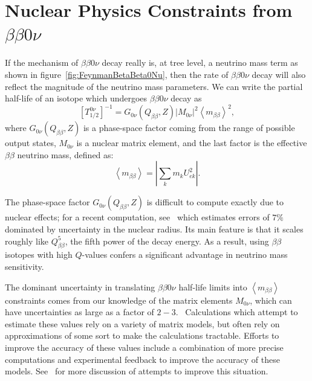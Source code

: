 \section{Nuclear Physics Constraints from \texorpdfstring{$\beta\beta 0\nu$}{Neutrinoless Double-Beta}}\label{sec:NucPhysConstraintsFromBB0N}

If the mechanism of $\beta\beta 0\nu$ decay really is, at tree level, a neutrino mass term as shown in figure~\ref{fig:FeynmanBetaBeta0Nu}, then the rate of $\beta\beta 0\nu$ decay will also reflect the magnitude of the neutrino mass parameters.  We can write the partial half-life of an isotope which undergoes $\beta\beta 0\nu$ decay as
\begin{equation}
\left[T^{0\nu}_{1/2}\right]^{-1} = G_{0\nu}(Q_{\beta\beta}, Z) \left| M_{0\nu}\right|^2 \left< m_{\beta\beta} \right>^2,
\end{equation}
where $G_{0\nu}(Q_{\beta\beta}, Z)$ is a phase-space factor coming from the range of possible output states, $M_{0\nu}$ is a nuclear matrix element, and the last factor is the effective $\beta\beta$ neutrino mass, defined as:
\begin{equation} \label{eq:DestructiveMassInteraction}
\left< m_{\beta\beta} \right> = \left|\sum_k m_k U_{ek}^2\right|.
\end{equation}

The phase-space factor $G_{0\nu}(Q_{\beta\beta}, Z)$ is difficult to compute exactly due to nuclear effects; for a recent computation, see~\cite{PhysRevC.85.034316} which estimates errors of $7\%$ dominated by uncertainty in the nuclear radius.  Its main feature is that it scales roughly like $Q_{\beta\beta}^5$, the fifth power of the decay energy.  As a result, using $\beta\beta$ isotopes with high $Q$-values confers a significant advantage in neutrino mass sensitivity.

The dominant uncertainty in translating $\beta\beta 0\nu$ half-life limits into $\left< m_{\beta\beta} \right>$ constraints comes from our knowledge of the matrix elements $M_{0\nu}$, which can have uncertainties as large as a factor of $2-3$.~\cite{RMPbb0n}  Calculations which attempt to estimate these values rely on a variety of matrix models, but often rely on approximations of some sort to make the calculations tractable.  Efforts to improve the accuracy of these values include a combination of more precise computations and experimental feedback to improve the accuracy of these models.  See~\cite{ZuberWorkshop} for more discussion of attempts to improve this situation.


